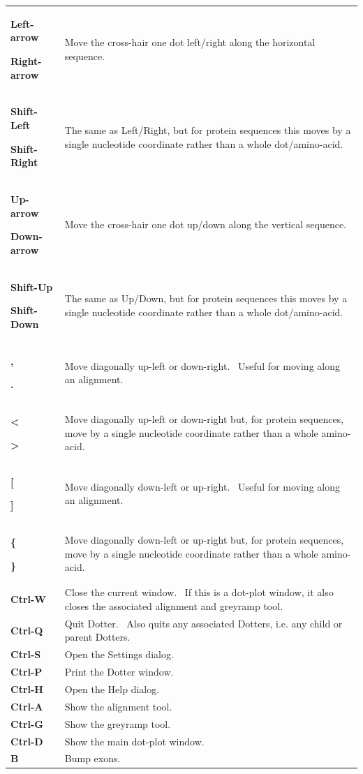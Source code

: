 \documentclass{report}
\begin{document}
\begin{flushleft}
\tablehead{}
\begin{supertabular}{p{2.222cm}p{11.729cm}}
{\bfseries Left-arrow}

\bfseries Right-arrow &
 Move the cross-hair one dot left/right along
the horizontal sequence.\\
{\bfseries Shift-Left}

\bfseries Shift-Right &
 The same as Left/Right, but for protein
sequences this moves by a single nucleotide coordinate rather than a
whole dot/amino-acid.\\
{\bfseries Up-arrow}

\bfseries Down-arrow &
 Move the cross-hair one dot up/down along the
vertical sequence.\\
{\bfseries Shift-Up}

\bfseries Shift-Down &
 The same as Up/Down, but for protein sequences
this moves by a single nucleotide coordinate rather than a whole
dot/amino-acid.\\
{\bfseries ,}

\bfseries . &
 Move diagonally up-left or down-right. \ Useful
for moving along an alignment.\\
{\bfseries {\textless}}

\bfseries {\textgreater} &
 Move diagonally up-left or down-right but, for
protein sequences, move by a single nucleotide coordinate rather than a
whole amino-acid.\\
{\bfseries [}

\bfseries ] &
 Move diagonally down-left or up-right. \ Useful
for moving along an alignment.\\
{\bfseries \{}

\bfseries \} &
 Move diagonally down-left or up-right but, for
protein sequences, move by a single nucleotide coordinate rather than a
whole amino-acid.\\
\bfseries Ctrl-W &
 Close the current window. \ If this is a
dot-plot window, it also closes the associated alignment and greyramp
tool.\\
\bfseries Ctrl-Q &
 Quit Dotter. \ Also quits any associated
Dotters, i.e. any child or parent Dotters.\\
\bfseries Ctrl-S &
 Open the Settings dialog.\\
\bfseries Ctrl-P &
 Print the Dotter window.\\
\bfseries Ctrl-H &
 Open the Help dialog.\\
\bfseries Ctrl-A &
 Show the alignment tool.\\
\bfseries Ctrl-G &
 Show the greyramp tool.\\
\bfseries Ctrl-D &
 Show the main dot-plot window.\\
\bfseries B &
 Bump exons.\\
\end{supertabular}
\end{flushleft}
\end{document}

